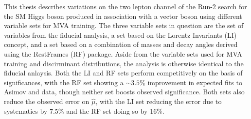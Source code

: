 




This thesis describes variations on the two lepton channel of the Run-2 search for the SM Higgs boson produced in association with a vector boson using different variable sets for MVA training.  
The three variable sets in question are the set of variables from the fiducial analysis, a set based on the Lorentz Invariants (LI) concept, and a set based on a combination of masses and decay angles derived using the RestFrames (RF) package.
Aside from the variable sets used for MVA training and discirminant distributions, the analysis is otherwise identical to the fiducial anlaysis. %
Both the LI and RF sets perform competitively on the basis of significances, with the RF set showing a $\sim3.5$\% improvement in expected fits to Asimov and data, though neither set boosts observed significance.
Both sets also reduce the observed error on $\hat{\mu}$, with the LI set reducing the error due to systematics by 7.5\% and the RF set doing so by 16\%.
